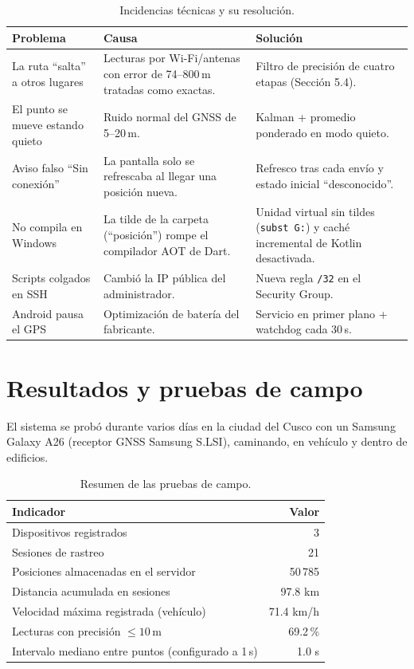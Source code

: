 \documentclass[11pt]{article}
\begin{document}
\begin{table}[H]
\centering
\small
\begin{tabularx}{\linewidth}{>{\raggedright\arraybackslash}p{3.6cm} X X}
\toprule
\textbf{Problema} & \textbf{Causa} & \textbf{Solución} \\
\midrule
La ruta ``salta'' a otros lugares & Lecturas por Wi-Fi/antenas con error de 74--800\,m tratadas como exactas. & Filtro de precisión de cuatro etapas (Sección 5.4). \\
El punto se mueve estando quieto & Ruido normal del GNSS de 5--20\,m. & Kalman + promedio ponderado en modo quieto. \\
Aviso falso ``Sin conexión'' & La pantalla solo se refrescaba al llegar una posición nueva. & Refresco tras cada envío y estado inicial ``desconocido''. \\
No compila en Windows & La tilde de la carpeta (``posición'') rompe el compilador AOT de Dart. & Unidad virtual sin tildes (\texttt{subst G:}) y caché incremental de Kotlin desactivada. \\
Scripts colgados en SSH & Cambió la IP pública del administrador. & Nueva regla \texttt{/32} en el Security Group. \\
Android pausa el GPS & Optimización de batería del fabricante. & Servicio en primer plano + watchdog cada 30\,s. \\
\bottomrule
\end{tabularx}
\caption{Incidencias técnicas y su resolución.}
\end{table}

\section{Resultados y pruebas de campo}

El sistema se probó durante varios días en la ciudad del Cusco con un Samsung Galaxy A26 (receptor GNSS
Samsung S.LSI), caminando, en vehículo y dentro de edificios.

\begin{table}[H]
\centering
\small
\begin{tabular}{l r}
\toprule
\textbf{Indicador} & \textbf{Valor} \\
\midrule
Dispositivos registrados & 3 \\
Sesiones de rastreo & 21 \\
Posiciones almacenadas en el servidor & 50\,785 \\
Distancia acumulada en sesiones & 97.8 km \\
Velocidad máxima registrada (vehículo) & 71.4 km/h \\
Lecturas con precisión $\le 10$\,m & 69.2\,\% \\
Intervalo mediano entre puntos (configurado a 1\,s) & 1.0 s \\
\bottomrule
\end{tabular}
\caption{Resumen de las pruebas de campo.}
\end{table}
\end{document}
